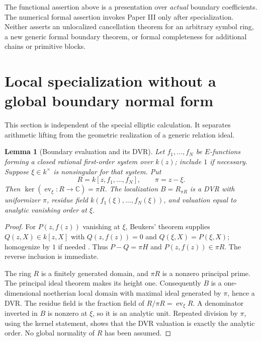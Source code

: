 \documentclass[11pt]{article}
\numberwithin{equation}{section}
\newtheorem{lemma}[lemma]{Lemma}
\theoremstyle{definition}
\theoremstyle{remark}
\newcommand{\C}{\mathbb C}
\begin{document}
The functional assertion above is a presentation over \emph{actual}
boundary coefficients. The numerical formal assertion invokes Paper III
only after specialization. Neither asserts an unlocalized cancellation
theorem for an arbitrary symbol ring, a new generic formal boundary
theorem, or formal completeness for additional chains or primitive blocks.

\section{Local specialization without a global boundary normal form}
\label{sec:local-specialization}
This section is independent of the special elliptic calculation. It
separates arithmetic lifting from the geometric realization of a generic
relation ideal.

\begin{lemma}[Boundary evaluation and its DVR]\label{lem:boundary-dvr}
Let $f_1,\ldots,f_N$ be $E$-functions forming a closed rational first-order
system over $k(z)$; include $1$ if necessary. Suppose $\xi\in k^\times$
is nonsingular for that system. Put
\[
 R=k[z,f_1,\ldots,f_N],\qquad \pi=z-\xi.
\]
Then $\ker(\operatorname{ev}_\xi:R\to\C)=\pi R$.
The localization $B=R_{\pi R}$ is a DVR with uniformizer $\pi$, residue
field $k(f_1(\xi),\ldots,f_N(\xi))$, and valuation equal to analytic
vanishing order at $\xi$.
\end{lemma}
\begin{proof}
For $P(z,f(z))$ vanishing at $\xi$, Beukers' theorem supplies
$Q(z,X)\in k[z,X]$ with $Q(z,f(z))=0$ and
$Q(\xi,X)=P(\xi,X)$; homogenize by $1$ if needed
\cite[Theorems 1.2--1.3]{Beukers}. Thus $P-Q=\pi H$ and
$P(z,f(z))\in\pi R$. The reverse inclusion is immediate.

The ring $R$ is a finitely generated domain, and $\pi R$ is a nonzero
principal prime. The principal ideal theorem makes its height one.
Consequently $B$ is a one-dimensional noetherian local domain with maximal
ideal generated by $\pi$, hence a DVR. The residue field is the fraction
field of $R/\pi R=\operatorname{ev}_\xi R$. A denominator inverted in
$B$ is nonzero at $\xi$, so it is an analytic unit. Repeated division by
$\pi$, using the kernel statement, shows that the DVR valuation is exactly
the analytic order. No global normality of $R$ has been assumed.
\end{proof}
\end{document}
